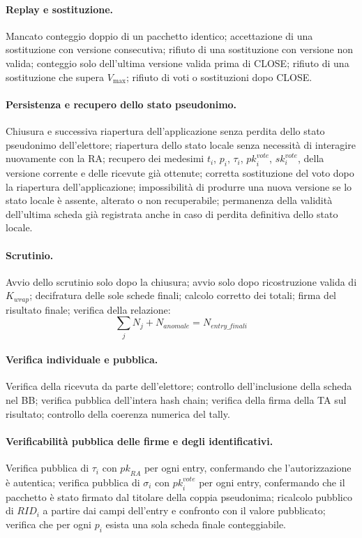 \documentclass[12pt,a4paper]{article}
\newcommand{\pk}{\mathit{pk}}
\newcommand{\sk}{\mathit{sk}}
\begin{document}
\paragraph{Replay e sostituzione.}
Mancato conteggio doppio di un pacchetto identico; accettazione di una sostituzione con versione consecutiva; rifiuto di una sostituzione con versione non valida; conteggio solo dell'ultima versione valida prima di CLOSE; rifiuto di una sostituzione che supera $V_{\max}$; rifiuto di voti o sostituzioni dopo CLOSE.

\paragraph{Persistenza e recupero dello stato pseudonimo.}
Chiusura e successiva riapertura dell'applicazione senza perdita
dello stato pseudonimo dell'elettore; riapertura dello stato locale
senza necessit\`a di interagire nuovamente con la RA; recupero dei
medesimi $t_i$, $p_i$, $\tau_i$, $\pk_i^{\mathit{vote}}$,
$\sk_i^{\mathit{vote}}$, della versione corrente e delle ricevute
gi\`a ottenute; corretta sostituzione del voto dopo la riapertura
dell'applicazione; impossibilit\`a di produrre una nuova versione
se lo stato locale \`e assente, alterato o non recuperabile;
permanenza della validit\`a dell'ultima scheda gi\`a registrata
anche in caso di perdita definitiva dello stato locale.

\paragraph{Scrutinio.}
Avvio dello scrutinio solo dopo la chiusura; avvio solo dopo ricostruzione valida di $K_{\mathit{wrap}}$; decifratura delle sole schede finali; calcolo corretto dei totali; firma del risultato finale; verifica della relazione:
\[
\sum_j N_j + N_{\mathit{anomale}} = N_{\mathit{entry\_finali}}
\]

\paragraph{Verifica individuale e pubblica.}
Verifica della ricevuta da parte dell'elettore; controllo dell'inclusione della scheda nel BB; verifica pubblica dell'intera hash chain; verifica della firma della TA sul risultato; controllo della coerenza numerica del tally.

\paragraph{Verificabilit\`a pubblica delle firme e degli identificativi.}
Verifica pubblica di $\tau_i$ con $\pk_{\mathit{RA}}$ per ogni entry, confermando che l'autorizzazione \`e autentica; verifica pubblica di $\sigma_i$ con $\pk_i^{\mathit{vote}}$ per ogni entry, confermando che il pacchetto \`e stato firmato dal titolare della coppia pseudonima; ricalcolo pubblico di $\mathit{RID}_i$ a partire dai campi dell'entry e confronto con il valore pubblicato; verifica che per ogni $p_i$ esista una sola scheda finale conteggiabile.
\end{document}
